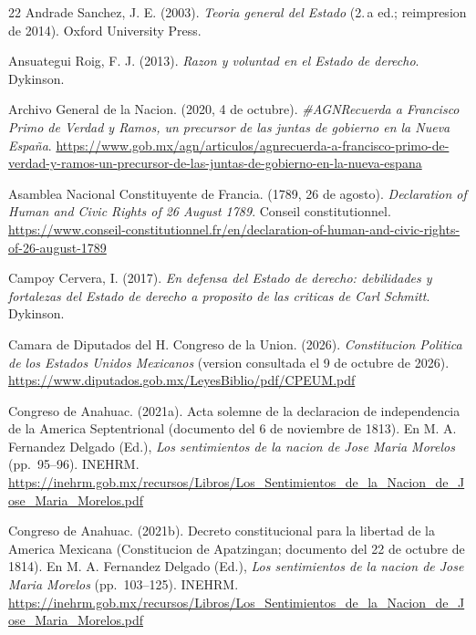 \documentclass[spanish,letterpaper,oneside]{article}
\begin{document}
\clearpage
\singlespacing
\begin{thebibliography}{22}
\setlength{\itemsep}{0pt}
Andrade Sanchez, J. E. (2003). \emph{Teoria general del Estado}
(2.\,a ed.; reimpresion de 2014). Oxford University Press.

Ansuategui Roig, F. J. (2013). \emph{Razon y voluntad en el Estado de
derecho}. Dykinson.

Archivo General de la Nacion. (2020, 4 de octubre).
\emph{\#AGNRecuerda a Francisco Primo de Verdad y Ramos, un precursor
de las juntas de gobierno en la Nueva España}.
\url{https://www.gob.mx/agn/articulos/agnrecuerda-a-francisco-primo-de-verdad-y-ramos-un-precursor-de-las-juntas-de-gobierno-en-la-nueva-espana}

Asamblea Nacional Constituyente de Francia. (1789, 26 de agosto).
\emph{Declaration of Human and Civic Rights of 26 August 1789}.
Conseil constitutionnel.
\url{https://www.conseil-constitutionnel.fr/en/declaration-of-human-and-civic-rights-of-26-august-1789}

Campoy Cervera, I. (2017). \emph{En defensa del Estado de derecho:
debilidades y fortalezas del Estado de derecho a proposito de las
criticas de Carl Schmitt}. Dykinson.

Camara de Diputados del H. Congreso de la Union. (2026).
\emph{Constitucion Politica de los Estados Unidos Mexicanos}
(version consultada el 9 de octubre de 2026).
\url{https://www.diputados.gob.mx/LeyesBiblio/pdf/CPEUM.pdf}

Congreso de Anahuac. (2021a). Acta solemne de la declaracion de
independencia de la America Septentrional (documento del 6 de noviembre
de 1813). En M. A. Fernandez Delgado (Ed.), \emph{Los sentimientos de
la nacion de Jose Maria Morelos} (pp.~95--96). INEHRM.
\url{https://inehrm.gob.mx/recursos/Libros/Los_Sentimientos_de_la_Nacion_de_Jose_Maria_Morelos.pdf}

Congreso de Anahuac. (2021b). Decreto constitucional para la libertad de
la America Mexicana (Constitucion de Apatzingan; documento del 22 de
octubre de 1814). En M. A. Fernandez Delgado (Ed.), \emph{Los
sentimientos de la nacion de Jose Maria Morelos} (pp.~103--125). INEHRM.
\url{https://inehrm.gob.mx/recursos/Libros/Los_Sentimientos_de_la_Nacion_de_Jose_Maria_Morelos.pdf}


\end{thebibliography}
\end{document}
